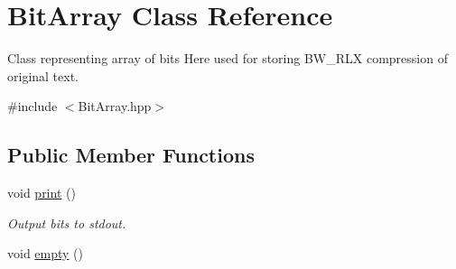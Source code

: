 \hypertarget{class_bit_array}{\section{\-Bit\-Array \-Class \-Reference}
\label{class_bit_array}
}


\-Class representing array of bits \-Here used for storing \-B\-W\-\_\-\-R\-L\-X compression of original text.  




{\ttfamily \#include $<$\-Bit\-Array.\-hpp$>$}

\subsection*{\-Public \-Member \-Functions}
\begin{DoxyCompactItemize}
\item 
\hypertarget{class_bit_array_a905dfc982d3ec1d74da3cacc400fae66}{void \hyperlink{class_bit_array_a905dfc982d3ec1d74da3cacc400fae66}{print} ()}\label{class_bit_array_a905dfc982d3ec1d74da3cacc400fae66}

\begin{DoxyCompactList}\small\item\em \-Output bits to stdout. \end{DoxyCompactList}\item 
\hypertarget{class_bit_array_aaa3d47e9bb289983cc7ceaf5cba1d1ce}{void \hyperlink{class_bit_array_aaa3d47e9bb289983cc7ceaf5cba1d1ce}{empty} ()}\label{class_bit_array_aaa3d47e9bb289983cc7ceaf5cba1d1ce}


\end{DoxyCompactItemize}
